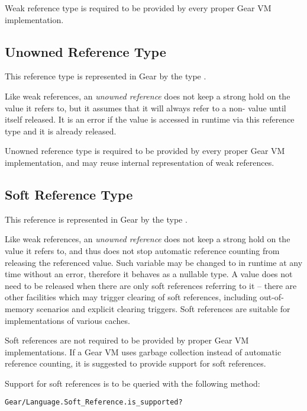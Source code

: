 Weak reference type is required to be provided by every proper Gear VM implementation. 





\subsection{Unowned Reference Type}

This reference type is represented in Gear by the type . 

Like weak references, an {\em unowned reference} does not keep a strong hold on the value it refers to, but it assumes that it will always refer to a non- value until itself released. It is an error if the value is accessed in runtime via this reference type and it is already released. 

Unowned reference type is required to be provided by every proper Gear VM implementation, and may reuse internal representation of weak references. 





\subsection{Soft Reference Type}

This reference is represented in Gear by the type . 

Like weak references, an {\em unowned reference} does not keep a strong hold on the value it refers to, and thus does not stop automatic reference counting from releasing the referenced value. Such variable may be changed to  in runtime at any time without an error, therefore it behaves as a nullable type. A value does not need to be released when there are only soft references referring to it -- there are other facilities which may trigger clearing of soft references, including out-of-memory scenarios and explicit clearing triggers. Soft references are suitable for implementations of various caches. 

Soft references are not required to be provided by proper Gear VM implementations. If a Gear VM uses garbage collection instead of automatic reference counting, it is suggested to provide support for soft references. 

Support for soft references is to be queried with the following method:
\begin{lstlisting}
Gear/Language.Soft_Reference.is_supported?
\end{lstlisting}





